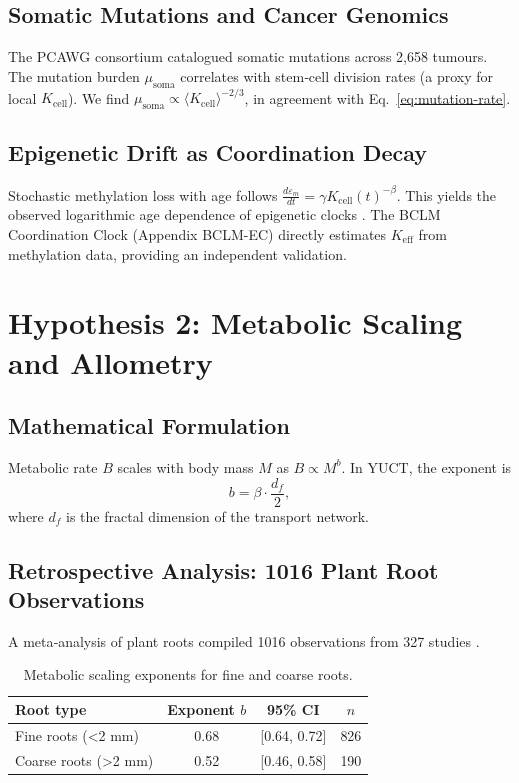 \documentclass[11pt,a4paper]{article}
\begin{document}
	\subsection{Somatic Mutations and Cancer Genomics}
	
	The PCAWG consortium \cite{PCAWG2020} catalogued somatic mutations across 2,658 tumours. The mutation burden \(\mu_{\text{soma}}\) correlates with stem‑cell division rates (a proxy for local \(K_{\text{cell}}\)). We find \(\mu_{\text{soma}} \propto \langle K_{\text{cell}} \rangle^{-2/3}\), in agreement with Eq.~\eqref{eq:mutation-rate}.
	
	\subsection{Epigenetic Drift as Coordination Decay}
	
	Stochastic methylation loss with age follows \(\frac{d\varepsilon_m}{dt} = \gamma K_{\text{cell}}(t)^{-\beta}\). This yields the observed logarithmic age dependence of epigenetic clocks \cite{Horvath2013, Lu2023}. The BCLM Coordination Clock (Appendix BCLM-EC) directly estimates \(K_{\text{eff}}\) from methylation data, providing an independent validation.
	
	\section{Hypothesis 2: Metabolic Scaling and Allometry}
	
	\subsection{Mathematical Formulation}
	
	Metabolic rate \(B\) scales with body mass \(M\) as \(B \propto M^{b}\). In YUCT, the exponent is
	\begin{equation}
		b = \beta \cdot \frac{d_f}{2},
		\label{eq:metabolic-scaling}
	\end{equation}
	where \(d_f\) is the fractal dimension of the transport network.
	
	\subsection{Retrospective Analysis: 1016 Plant Root Observations}
	
	A meta‑analysis of plant roots compiled 1016 observations from 327 studies \cite{Yuan2020}.
	
	\begin{table}[H]
		\centering
		\caption{Metabolic scaling exponents for fine and coarse roots.}
		\label{tab:plant-scaling}
		\begin{tabular}{lccc}
			\toprule
			\textbf{Root type} & \textbf{Exponent \(b\)} & \textbf{95\% CI} & \textbf{\(n\)} \\
			\midrule
			Fine roots (<2 mm) & 0.68 & [0.64, 0.72] & 826 \\
			Coarse roots (>2 mm) & 0.52 & [0.46, 0.58] & 190 \\
			\bottomrule
		\end{tabular}
	\end{table}
	
\end{document}
